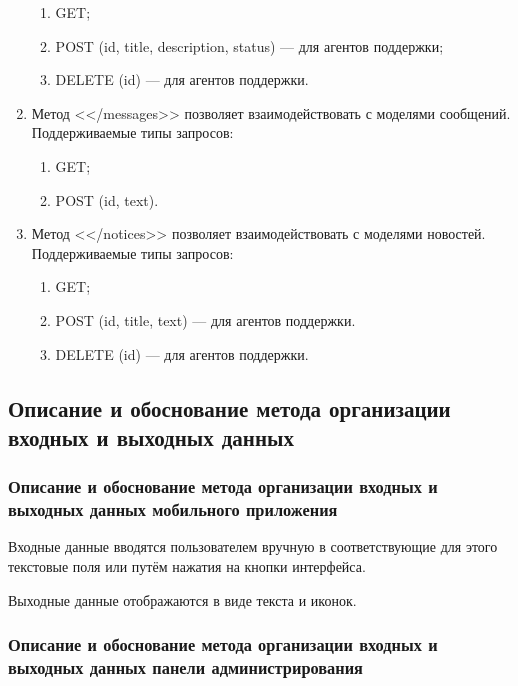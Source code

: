 \documentclass{../includes/TechDoc}
\begin{document}
\begin{enumerate}
        \begin{enumerate}
            \item GET\@;
            \item POST (id, title, description, status) — для агентов поддержки;
            \item DELETE (id) — для агентов поддержки.
        \end{enumerate}
        \item Метод <</messages>> позволяет взаимодействовать с моделями сообщений.\\
        Поддерживаемые типы запросов:
        \begin{enumerate}
            \item GET\@;
            \item POST (id, text)\@.
        \end{enumerate}
        \item Метод <</notices>> позволяет взаимодействовать с моделями новостей.
        Поддерживаемые типы запросов:
        \begin{enumerate}
            \item GET\@;
            \item POST (id, title, text) — для агентов поддержки.
            \item DELETE (id) — для агентов поддержки.
        \end{enumerate}
    \end{enumerate}

    \clearpage

    \subsection{Описание и обоснование метода организации входных и выходных данных}

    \subsubsection{Описание и обоснование метода организации входных и выходных данных мобильного приложения}

    Входные данные вводятся пользователем вручную в соответствующие для этого текстовые поля или путём нажатия на кнопки интерфейса.

    Выходные данные отображаются в виде текста и иконок.

    \subsubsection{Описание и обоснование метода организации входных и выходных данных панели администрирования}
\end{document}
